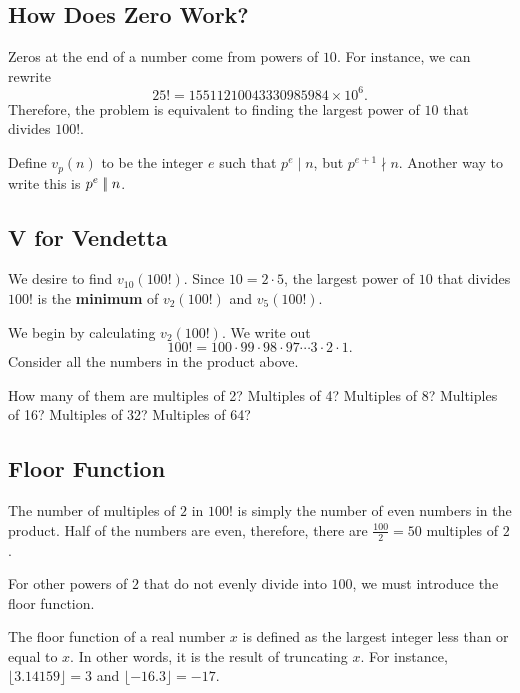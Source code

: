 \clearpage 

\subsection*{How Does Zero Work?}

Zeros at the end of a number come from powers of $10$.  For instance, we can rewrite $$25!=15511210043330985984\times 10^6.$$  
Therefore, the problem is equivalent to finding the largest power of $10$ that divides $100!$.  \begin{defi}  Define $v_p(n)$ to be the integer $e$ such that $p^e\mid n$, but $p^{e+1}\nmid n$. Another way to write this is $p^e\mid\!\mid n$. \end{defi} 

\clearpage



\subsection*{V for Vendetta}

We desire to find $v_{10}(100!)$.  Since $10=2\cdot 5$, the largest power of $10$ that divides $100!$ is the \textbf{minimum} of $v_2(100!)$ and $v_5(100!)$.  

We begin by calculating $v_2(100!)$. We write out $$100!=100\cdot 99\cdot 98\cdot 97\cdots 3\cdot 2\cdot 1.$$  Consider all the numbers in the product above. 

How many of them are multiples of 2?  Multiples of 4?  Multiples of 8?  Multiples of 16?  Multiples of 32?  Multiples of 64?  

\clearpage 

\subsection*{Floor Function}

The number of multiples of $2$ in $100!$ is simply the number of even numbers in the product. Half of the numbers are even, therefore, there are $\frac{100}{2}=50$ multiples of $2$.  

For other powers of $2$ that do not evenly divide into $100$, we must introduce the floor function.  

\begin{defi} The floor function of a real number $x$ is defined as the largest integer less than or equal to $x$. In other words, it is the result of truncating $x$. For instance, $\lfloor 3.14159 \rfloor=3$ and $\lfloor -16.3 \rfloor=-17$. \end{defi}

